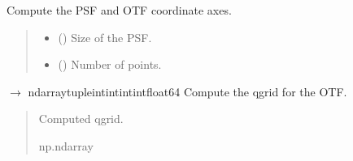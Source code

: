 \documentclass[letterpaper,10pt,english]{sphinxmanual}
\begin{document}
\begin{fulllineitems}
\begin{fulllineitems}
\label{\detokenize{source/OpticalSystems:OpticalSystems.OpticalSystem3D.compute_psf_and_otf_cordinates}}
\pysigstartsignatures
\pysiglinewithargsret
{}
{\sphinxparamcomma {}}
{}
\pysigstopsignatures
\sphinxAtStartPar
Compute the PSF and OTF coordinate axes.
\begin{quote}\begin{description}
\begin{itemize}
\item {} 
\sphinxAtStartPar
{} () \textendash{} Size of the PSF.

\item {} 
\sphinxAtStartPar
{} () \textendash{} Number of points.

\end{itemize}

\end{description}\end{quote}

\end{fulllineitems}


\begin{fulllineitems}
\label{\detokenize{source/OpticalSystems:OpticalSystems.OpticalSystem3D.compute_q_grid}}
\pysigstartsignatures
\pysiglinewithargsret
{}
{}
{{ $\rightarrow$ ndarray\DUrole{p}{{[}}tuple\DUrole{p}{{[}}intintintint\DUrole{p}{{]}}float64\DUrole{p}{{]}}}}
\pysigstopsignatures
\sphinxAtStartPar
Compute the q\sphinxhyphen{}grid for the OTF.
\begin{quote}\begin{description}
\sphinxAtStartPar
Computed q\sphinxhyphen{}grid.

\sphinxAtStartPar
np.ndarray

\end{description}\end{quote}


\end{fulllineitems}
\end{fulllineitems}
\end{document}
